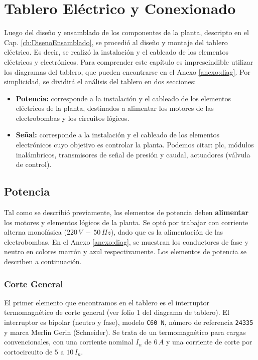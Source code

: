 \chapter{Tablero Eléctrico y Conexionado}
\label{ch:tablero}

Luego del diseño y ensamblado de los componentes de la planta, descripto en el
Cap.
\ref{ch:DisenoEnsamblado}, se procedió al diseño y montaje del
tablero eléctrico.
Es decir, se realizó la instalación y el cableado de los elementos eléctricos y
electrónicos.
Para comprender este capítulo es imprescindible utilizar los diagramas
del tablero, que pueden encontrarse en el Anexo \ref{anexo:diag}.
Por simplicidad, se dividirá el análisis del tablero en dos secciones:
\begin{itemize}
 \item \textbf{Potencia:} corresponde a la instalación y el cableado
 de los elementos eléctricos de la planta, destinados a alimentar los motores de
 las electrobombas y los circuitos lógicos.
 \item \textbf{Señal:} corresponde a la instalación y el cableado
 de los elementos electrónicos cuyo objetivo es controlar la planta.
 Podemos citar: \gls{plc}, módulos inalámbricos,
 transmisores de señal de presión y caudal, actuadores (válvula de control).
\end{itemize}

\section{Potencia}
\label{sec:Potencia}
Tal como se describió previamente, los elementos de potencia deben
\textbf{alimentar} los motores y elementos lógicos de la planta.
Se optó por trabajar con corriente alterna monofásica ($220\,V\,-\,50\,Hz$),
dado que es la alimentación de las electrobombas.
En el Anexo \ref{anexo:diag}, se muestran los conductores de fase y neutro en
colores marrón y azul respectivamente.
Los elementos de potencia se describen a continuación.

\subsection{Corte General}
\label{subsec:corteGeneral}
El primer elemento que encontramos en el tablero es el interruptor
termomagnético de corte general (ver folio 1 del diagrama de tablero).
El interruptor es bipolar (neutro y fase), modelo \verb|C60 N|, número de
referencia \verb|24335| y marca Merlin Gerin (Schneider).
Se trata de un termomagnético para cargas convencionales, con una corriente
nominal $I_n$ de $6\,A$ y una corriente de corte por cortocircuito de $5$ a
$10\,I_n$.

